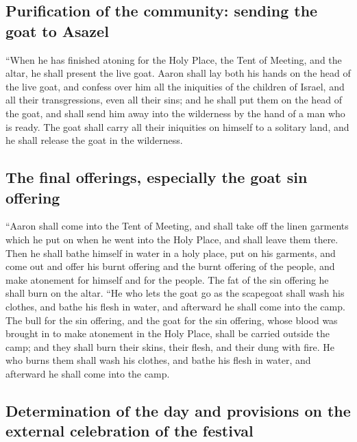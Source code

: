 \hypertarget{purification-of-the-community-sending-the-goat-to-asazel}{%
\subsection{Purification of the community: sending the goat to
Asazel}\label{purification-of-the-community-sending-the-goat-to-asazel}}

 ``When he has finished atoning for the Holy Place, the
Tent of Meeting, and the altar, he shall present the live goat.
 Aaron shall lay both his hands on the head of the live
goat, and confess over him all the iniquities of the children of Israel,
and all their transgressions, even all their sins; and he shall put them
on the head of the goat, and shall send him away into the wilderness by
the hand of a man who is ready.  The goat shall carry all
their iniquities on himself to a solitary land, and he shall release the
goat in the wilderness.

\hypertarget{the-final-offerings-especially-the-goat-sin-offering}{%
\subsection{The final offerings, especially the goat sin
offering}\label{the-final-offerings-especially-the-goat-sin-offering}}

 ``Aaron shall come into the Tent of Meeting, and shall
take off the linen garments which he put on when he went into the Holy
Place, and shall leave them there.  Then he shall bathe
himself in water in a holy place, put on his garments, and come out and
offer his burnt offering and the burnt offering of the people, and make
atonement for himself and for the people.  The fat of the
sin offering he shall burn on the altar.  ``He who lets
the goat go as the scapegoat shall wash his clothes, and bathe his flesh
in water, and afterward he shall come into the camp.  The
bull for the sin offering, and the goat for the sin offering, whose
blood was brought in to make atonement in the Holy Place, shall be
carried outside the camp; and they shall burn their skins, their flesh,
and their dung with fire.  He who burns them shall wash
his clothes, and bathe his flesh in water, and afterward he shall come
into the camp.

\hypertarget{determination-of-the-day-and-provisions-on-the-external-celebration-of-the-festival}{%
\subsection{Determination of the day and provisions on the external
celebration of the
festival}\label{determination-of-the-day-and-provisions-on-the-external-celebration-of-the-festival}}


